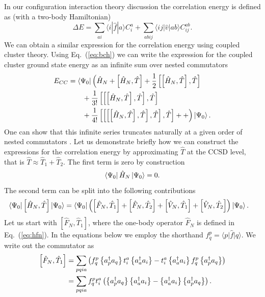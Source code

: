   In our configuration interaction theory discussion the correlation energy is defined as (with a two-body Hamiltonian) 
  \[
  \Delta E=\sum_{ai}\langle i| \hat{f}|a \rangle C_{i}^{a}+
  \sum_{abij}\langle ij | \hat{v}| ab \rangle C_{ij}^{ab}.
  \]
We can obtain a similar expression for the correlation energy using coupled cluster theory. 
Using Eq.~(\ref{eq:bch}) we can write the expression for the coupled cluster  ground state energy as an infinite sum over nested commutators
        \begin{align*}
            E_{CC} &= \bra{\Psi_0}\Bigl( \hat{H}_N + \left[ \hat{H}_N, \hat{T} \right] +
                \frac{1}{2} \left[\left[ \hat{H}_N, \hat{T} \right], \hat{T}\right] \\
                & \qquad + \frac{1}{3!} \left[ \left[\left[ \hat{H}_N, \hat{T} \right], \hat{T}\right], \hat{T} \right] \\
                & \qquad + \frac{1}{4!} \left[ \left[ \left[\left[ \hat{H}_N, \hat{T} \right], \hat{T}\right], \hat{T} \right], \hat{T} \right] ++ \Bigr) \ket{\Psi_0}. \\
        \end{align*}
One can show that this infinite series truncates naturally at a given order of nested commutators \cite{shavittbartlett2009}. 
Let us demonstrate briefly how we can construct the expressions for the correlation 
energy by approximating $\hat{T}$ at the CCSD level, that is $\hat{T}\approx \hat{T}_1+\hat{T}_2$.
        The first term is zero by construction
        \begin{equation*}
            \bra{\Psi_0} \hat{H}_N \ket{\Psi_0} = 0.
        \end{equation*}       
     The second term can be split into the following contributions
        \begin{align*}
        \bra{\Psi_0}\left[ \hat{H}_N, \hat{T} \right]\ket{\Psi_0} & = 
            \bra{\Psi_0} \Bigl(\left[ \hat{F}_N, \hat{T}_1 \right] + \left[ \hat{F}_N, \hat{T}_2 \right]
            + \left[ \hat{V}_N, \hat{T}_1 \right] + \left[ \hat{V}_N, \hat{T}_2 \right] \Bigr) \ket{\Psi_0}.
    \end{align*}
Let us start with $\left[ \hat{F}_N, \hat{T}_1 \right]$, where the one-body operator $\hat{F}_N$ is defined in Eq.~(\ref{eq:hfn}). 
In the equations below we employ the shorthand $f^p_q = \langle p\vert \hat{f} \vert q\rangle$.  
We write out the commutator  as
    \begin{align*}
        \left[ \hat{F}_N, \hat{T}_1 \right] &= \sum_{pqia} \left(f_q^p \left\{a_p^\dagger a_q\right\} 
            t_i^a \left\{a_a^\dagger a_i\right\} - t_i^a \left\{a_a^\dagger a_i\right\} f_q^p \left\{a_p^\dagger a_q\right\} \right) \\
        &= \sum_{pqia} f_q^p t_i^a \left( \left\{a_p^\dagger a_q\right\} \left\{a_a^\dagger a_i\right\} -
                \left\{a_a^\dagger a_i\right\} \left\{a_p^\dagger a_q\right\} \right).
    \end{align*}
